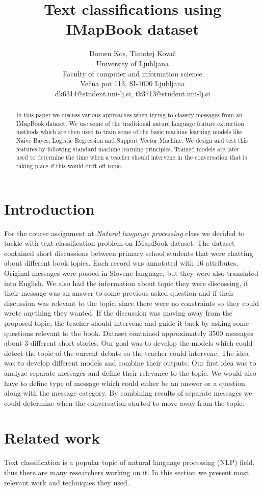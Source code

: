 \documentclass[11pt,a4paper]{article}
\title{Text classifications using IMapBook dataset}
\author{
 Domen Kos, Timotej Kovač \\
 University of Ljubljana \\
 Faculty of computer and information science \\
 Večna pot 113, SI-1000 Ljubljana \\
  {\sf dk6314@student.uni-lj.si, tk3713@student.uni-lj.si} \\
}
\date{}
\begin{document}
\maketitle
 \begin{abstract}
In this paper we discuss various approaches when trying to classify messages from an IMapBook dataset.
We use some of the traditional nature language feature extraction methods which are then used to train some of the basic machine learning models like Naive Bayes, Logistic Regression and Support Vector Machine.
We design and test this features by following standard machine learning principles.
Trained models are later used to determine the time when a teacher should intervene in the conversation that is taking place if this would drift off topic.
 \end{abstract}


\section{Introduction}
For the course assignment at \textit{Natural language processing} class we decided to tackle with text classification problem on IMapBook dataset.
The dataset contained short discussions between primary school students that were chatting about different book topics.
Each record was annotated with 16 attributes.
Original messages were posted in Slovene language, but they were also translated into English.
We also had the information about topic they were discussing, if their message was an answer to some previous asked question and if their discussion was relevant to the topic, since there were no constraints so they could wrote anything they wanted.
If the discussion was moving away from the proposed topic, the teacher should intervene and guide it back by asking some questions relevant to the book.
Dataset contained approximately 3500 messages about 3 different short stories.
Our goal was to develop the models which could detect the topic of the current debate so the teacher could intervene.
The idea was to develop different models and combine their outputs.
Our first idea was to analyze separate messages and define their relevance to the topic.
We would also have to define type of message which could either be an answer or a question along with the message category.
By combining results of separate messages we could determine when the conversation started to move away from the topic.

\section{Related work}
Text classification is a popular topic of natural language processing (NLP) field, thus there are many researchers working on it. 
In this section we present most relevant work and techniques they used.
\end{document}
